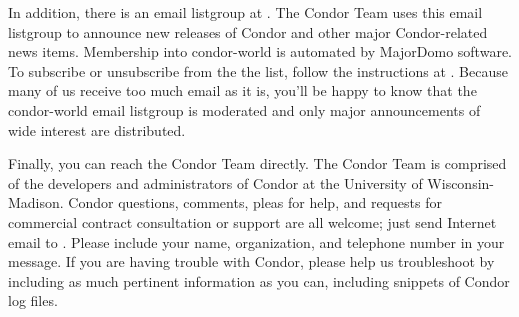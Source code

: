 In addition, there is an email listgroup at .  The Condor Team 
uses this email listgroup to announce new releases of Condor and other major Condor-related 
news items.  Membership into condor-world is automated by MajorDomo software.  To 
subscribe or unsubscribe from the the list, follow the instructions at  
.  Because many of us receive 
too much email as it is, you'll be happy to know that the condor-world email listgroup is 
moderated and only major announcements of wide interest are distributed.

Finally, you can reach the Condor Team directly.  The Condor Team is comprised of the 
developers and administrators of Condor at the University of Wisconsin-Madison. Condor 
questions, comments, pleas for help, and requests for commercial contract consultation or support 
are all welcome; just send Internet email to .  Please include your 
name, organization, and telephone number in your message.  If you are having trouble with 
Condor, please help us troubleshoot by including as much pertinent information as you can, 
including snippets of Condor log files. 


